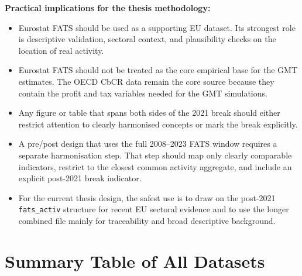 \documentclass[11pt,a4paper]{article}
\begin{document}
\noindent\textbf{Practical implications for the thesis methodology:}
\begin{itemize}[noitemsep]
    \item Eurostat FATS should be used as a supporting EU dataset.  Its strongest
    role is descriptive validation, sectoral context, and plausibility checks on
    the location of real activity.
    \item Eurostat FATS should not be treated as the core empirical base for the
    GMT estimates.  The OECD CbCR data remain the core source because they
    contain the profit and tax variables needed for the GMT simulations.
    \item Any figure or table that spans both sides of the 2021 break should
    either restrict attention to clearly harmonised concepts or mark the break
    explicitly.
    \item A pre/post design that uses the full 2008--2023 FATS window requires a
    separate harmonisation step.  That step should map only clearly comparable
    indicators, restrict to the closest common activity aggregate, and include
    an explicit post-2021 break indicator.
    \item For the current thesis design, the safest use is to draw on the
    post-2021 \texttt{fats\_activ} structure for recent EU sectoral evidence and
    to use the longer combined file mainly for traceability and broad descriptive
    background.
\end{itemize}


\section{Summary Table of All Datasets}
\label{sec:summary}
\end{document}
